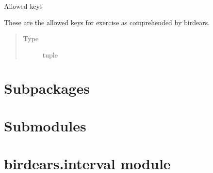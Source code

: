 \documentclass[letterpaper,10pt,english]{sphinxmanual}
\begin{document}

\begin{fulllineitems}
\label{\detokenize{index:birdears.KEYS}}
Allowed keys

These are the allowed keys for exercise as comprehended by birdears.
\begin{quote}\begin{description}
\item[{Type}] \leavevmode
tuple

\end{description}\end{quote}

\end{fulllineitems}



\section{Subpackages}
\label{\detokenize{index:subpackages}}

\section{Submodules}
\label{\detokenize{index:submodules}}

\section{birdears.interval module}
\label{\detokenize{index:module-birdears.interval}}\label{\detokenize{index:birdears-interval-module}}
\end{document}
